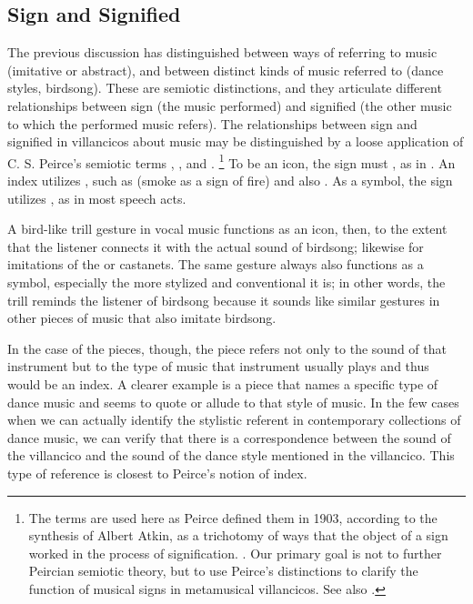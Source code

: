 \subsection{Sign and Signified}

The previous discussion has distinguished between ways of referring to music (imitative or abstract), and between distinct kinds of music referred to (dance styles, birdsong).
These are semiotic distinctions, and they articulate different relationships between sign (the music performed) and signified (the other music to which the performed music refers).
The relationships between sign and signified in villancicos about music may be distinguished by a loose application of C. S. Peirce's semiotic terms , , and .%
	\footnote{%
The terms are used here as Peirce defined them in 1903, according to the synthesis of Albert Atkin, as a trichotomy of ways that the object of a sign worked in the process of signification.
\autocite{Atkin:Peirce}.
Our primary goal is not to further Peircian semiotic theory, but to use Peirce's distinctions to clarify the function of musical signs in metamusical villancicos.
See also \autocite{Turino:Signs}.
	}
To be an icon, the sign must , as in .
An index utilizes , such as  (smoke as a sign of fire) and also .
As a symbol, the sign utilizes , as in most speech acts.%
	\autocite[§3.2]{Atkin:Peirce}

A bird-like trill gesture in vocal music functions as an icon, then, to the extent that the listener connects it with the actual sound of birdsong; likewise for imitations of the  or castanets. 
The same gesture always also functions as a symbol, especially the more stylized and conventional it is; in other words, the trill reminds the listener of birdsong because it sounds like similar gestures in other pieces of music that also imitate birdsong.

In the case of the  pieces, though, the piece refers not only to the sound of that instrument but to the type of music that instrument usually plays and thus would be an index.
A clearer example is a piece that names a specific type of dance music and seems to quote or allude to that style of music.
In the few cases when we can actually identify the stylistic referent in contemporary collections of dance music, we can verify that there is a  correspondence between the sound of the villancico and the sound of the dance style mentioned in the villancico.
This type of reference is closest to Peirce's notion of index.

